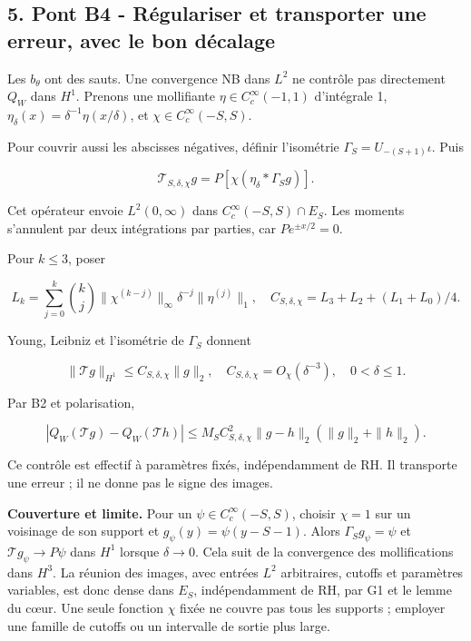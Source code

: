 \documentclass[
  10pt,
  a4paper,
]{article}
\begin{document}
\newpage

\hypertarget{pont-b4---ruxe9gulariser-et-transporter-une-erreur-avec-le-bon-duxe9calage}{%
\subsection{5. Pont B4 - Régulariser et transporter une erreur, avec le
bon
décalage}\label{pont-b4---ruxe9gulariser-et-transporter-une-erreur-avec-le-bon-duxe9calage}}

Les \(b_\theta\) ont des sauts. Une convergence NB dans \(L^2\) ne
contrôle pas directement \(Q_W\) dans \(H^1\). Prenons une mollifiante
\(\eta\in C_c^\infty(-1,1)\) d'intégrale 1,
\(\eta_\delta(x)=\delta^{-1}\eta(x/\delta)\), et
\(\chi\in C_c^\infty(-S,S)\).

Pour couvrir aussi les abscisses négatives, définir l'isométrie
\(\Gamma_S=U_{-(S+1)}\iota\). Puis

\[
\mathcal T_{S,\delta,\chi}g=P[\chi(\eta_\delta*\Gamma_Sg)].
\]

Cet opérateur envoie \(L^2(0,\infty)\) dans
\(C_c^\infty(-S,S)\cap E_S\). Les moments s'annulent par deux
intégrations par parties, car \(Pe^{\pm x/2}=0\).

Pour \(k\le3\), poser

\[
L_k=\sum_{j=0}^k\binom{k}{j}\|\chi^{(k-j)}\|_\infty
\delta^{-j}\|\eta^{(j)}\|_1,
\quad C_{S,\delta,\chi}=L_3+L_2+(L_1+L_0)/4.
\]

Young, Leibniz et l'isométrie de \(\Gamma_S\) donnent

\[
\|\mathcal Tg\|_{H^1}\le C_{S,\delta,\chi}\|g\|_2,
\quad C_{S,\delta,\chi}=O_\chi(\delta^{-3}),\quad0<\delta\le1.
\]

Par B2 et polarisation,

\[
|Q_W(\mathcal Tg)-Q_W(\mathcal Th)|
\le M_SC_{S,\delta,\chi}^2\|g-h\|_2(\|g\|_2+\|h\|_2).
\]

Ce contrôle est effectif à paramètres fixés, indépendamment de RH. Il
transporte une erreur ; il ne donne pas le signe des images.

\textbf{Couverture et limite.} Pour un \(\psi\in C_c^\infty(-S,S)\),
choisir \(\chi=1\) sur un voisinage de son support et
\(g_\psi(y)=\psi(y-S-1)\). Alors \(\Gamma_Sg_\psi=\psi\) et
\(\mathcal T g_\psi\to P\psi\) dans \(H^1\) lorsque \(\delta\to0\). Cela
suit de la convergence des mollifications dans \(H^3\). La réunion des
images, avec entrées \(L^2\) arbitraires, cutoffs et paramètres
variables, est donc dense dans \(E_S\), indépendamment de RH, par G1 et
le lemme du cœur. Une seule fonction \(\chi\) fixée ne couvre pas tous
les supports ; employer une famille de cutoffs ou un intervalle de
sortie plus large.
\end{document}
